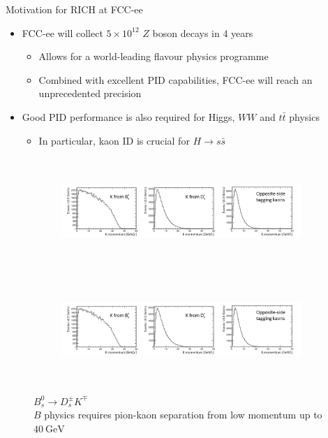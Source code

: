 \documentclass{beamer}
\begin{document}
\begin{frame}{Motivation for RICH at FCC-ee}
  \begin{itemize}
    \setlength\itemsep{0.7em}
    \item{FCC-ee will collect $5\times 10^{12}$ $Z$ boson decays in $4$ years}
    \begin{itemize}
      \item{Allows for a world-leading flavour physics programme}
      \item{Combined with excellent PID capabilities, FCC-ee will reach an unprecedented precision}
    \end{itemize}
    \item{Good PID performance is also required for Higgs, $WW$ and $t\bar{t}$ physics}
    \begin{itemize}
      \item{In particular, kaon ID is crucial for $H\to s\bar{s}$}
    \end{itemize}
  \end{itemize}
  \begin{figure}
    \centering
    \vspace{-0.2cm}
    \begin{subfigure}{0.5\textwidth}
      \includegraphics[height = 4cm, trim = {0 0 22.5cm 0}, clip = true]{Plots/p_spectrum_crop.png}
    \end{subfigure}%
    \begin{subfigure}{0.5\textwidth}
      \includegraphics[height = 4cm, trim = {22.0cm 0 0 0}, clip = true]{Plots/p_spectrum_crop.png}
    \end{subfigure}
    \caption{$B_s^0\to D_s^\pm K^\mp$\\$B$ physics requires pion-kaon separation from low momentum up to $\SI{40}{\giga\eV}$}
  \end{figure}
\end{frame}
\end{document}
